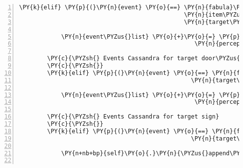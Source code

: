 \begin{Verbatim}[commandchars=\\\{\},numbers=left,firstnumber=1,stepnumber=1]
        \PY{k}{elif} \PY{p}{(}\PY{n}{event} \PY{o}{==} \PY{n}{fabula}\PY{o}{.}\PY{n}{TriesToDropEvent}\PY{p}{(}\PY{n}{identifier}\PY{o}{=}\PY{n}{ID\PYZus{}CASSANDRA}\PY{p}{,}
                                               \PY{n}{item\PYZus{}identifier}\PY{o}{=}\PY{l+s}{\PYZsq{}}\PY{l+s}{cobweb}\PY{l+s}{\PYZsq{}}\PY{p}{,}
                                               \PY{n}{target\PYZus{}identifier}\PY{o}{=}\PY{l+s}{\PYZsq{}}\PY{l+s}{key}\PY{l+s}{\PYZsq{}}\PY{p}{)}\PY{p}{)}\PY{p}{:}

            \PY{n}{event\PYZus{}list} \PY{o}{+}\PY{o}{=} \PY{p}{[}\PY{n}{fabula}\PY{o}{.}\PY{n}{PerceptionEvent}\PY{p}{(}\PY{n}{identifier}\PY{o}{=}\PY{n}{ID\PYZus{}CASSANDRA}\PY{p}{,}
                                                  \PY{n}{perception}\PY{o}{=}\PY{l+s}{\PYZsq{}}\PY{l+s}{Der Schlüssel muss nicht geklebt werden.}\PY{l+s}{\PYZsq{}}\PY{p}{)}\PY{p}{]}

        \PY{c}{\PYZsh{} Events Cassandra for target door\PYZus{}unlocked}
        \PY{c}{\PYZsh{}}
        \PY{k}{elif} \PY{p}{(}\PY{n}{event} \PY{o}{==} \PY{n}{fabula}\PY{o}{.}\PY{n}{TriesToLookAtEvent}\PY{p}{(}\PY{n}{identifier}\PY{o}{=}\PY{n}{ID\PYZus{}CASSANDRA}\PY{p}{,}
                                                 \PY{n}{target\PYZus{}identifier}\PY{o}{=}\PY{l+s}{\PYZsq{}}\PY{l+s}{door\PYZus{}unlocked}\PY{l+s}{\PYZsq{}}\PY{p}{)}\PY{p}{)}\PY{p}{:}

            \PY{n}{event\PYZus{}list} \PY{o}{+}\PY{o}{=} \PY{p}{[}\PY{n}{fabula}\PY{o}{.}\PY{n}{PerceptionEvent}\PY{p}{(}\PY{n}{identifier}\PY{o}{=}\PY{n}{ID\PYZus{}CASSANDRA}\PY{p}{,}
                                                  \PY{n}{perception}\PY{o}{=}\PY{l+s}{\PYZsq{}}\PY{l+s}{Die Tür ist offen, aber ich pass da nicht durch.}\PY{l+s}{\PYZsq{}}\PY{p}{)}\PY{p}{]}

        \PY{c}{\PYZsh{} Events Cassandra for target sign}
        \PY{c}{\PYZsh{}}
        \PY{k}{elif} \PY{p}{(}\PY{n}{event} \PY{o}{==} \PY{n}{fabula}\PY{o}{.}\PY{n}{TriesToLookAtEvent}\PY{p}{(}\PY{n}{identifier}\PY{o}{=}\PY{n}{ID\PYZus{}CASSANDRA}\PY{p}{,}
                                                 \PY{n}{target\PYZus{}identifier}\PY{o}{=}\PY{l+s}{\PYZsq{}}\PY{l+s}{sign}\PY{l+s}{\PYZsq{}}\PY{p}{)}\PY{p}{)}\PY{p}{:}

            \PY{n+nb+bp}{self}\PY{o}{.}\PY{n}{\PYZus{}append\PYZus{}sentence}\PY{p}{(}\PY{n}{ID\PYZus{}CASSANDRA}\PY{p}{,} \PY{l+s}{\PYZsq{}}\PY{l+s}{Laut dem Schild an der Brücke ist das Überfliegen erlaubt!}\PY{l+s}{\PYZsq{}}\PY{p}{)}


\end{Verbatim}
